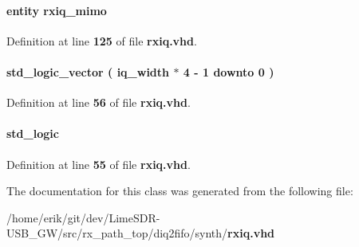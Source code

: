 \paragraph[{inst1\+\_\+rxiq\+\_\+mimo}]{ {\bfseries \textcolor{keywordflow}{entity}\textcolor{vhdlchar}{ }\textcolor{vhdlchar}{rxiq\+\_\+mimo}\textcolor{vhdlchar}{ }} \hspace{0.3cm}{\ttfamily [Instantiation]}}\label{classrxiq_1_1arch_a820adc5ca8b4e0109aa7436087538522}


Definition at line {\bf 125} of file {\bf rxiq.\+vhd}.

\paragraph[{mux\+\_\+fifo\+\_\+wdata}]{ {\bfseries \textcolor{comment}{std\+\_\+logic\+\_\+vector}\textcolor{vhdlchar}{ }\textcolor{vhdlchar}{(}\textcolor{vhdlchar}{ }\textcolor{vhdlchar}{ }\textcolor{vhdlchar}{ }\textcolor{vhdlchar}{ }{\bfseries {\bf iq\+\_\+width}} \textcolor{vhdlchar}{$\ast$}\textcolor{vhdlchar}{ } \textcolor{vhdldigit}{4} \textcolor{vhdlchar}{-\/}\textcolor{vhdlchar}{ } \textcolor{vhdldigit}{1} \textcolor{vhdlchar}{ }\textcolor{keywordflow}{downto}\textcolor{vhdlchar}{ }\textcolor{vhdlchar}{ } \textcolor{vhdldigit}{0} \textcolor{vhdlchar}{ }\textcolor{vhdlchar}{)}\textcolor{vhdlchar}{ }} \hspace{0.3cm}{\ttfamily [Signal]}}\label{classrxiq_1_1arch_aa03056f73be7924fbbf5b9ace3e06f3b}


Definition at line {\bf 56} of file {\bf rxiq.\+vhd}.

\paragraph[{mux\+\_\+fifo\+\_\+wrreq}]{ {\bfseries \textcolor{comment}{std\+\_\+logic}\textcolor{vhdlchar}{ }} \hspace{0.3cm}{\ttfamily [Signal]}}\label{classrxiq_1_1arch_ab4526061768b458604c6d3d36c712824}


Definition at line {\bf 55} of file {\bf rxiq.\+vhd}.



The documentation for this class was generated from the following file\+:\begin{DoxyCompactItemize}
\item 
/home/erik/git/dev/\+Lime\+S\+D\+R-\/\+U\+S\+B\+\_\+\+G\+W/src/rx\+\_\+path\+\_\+top/diq2fifo/synth/{\bf rxiq.\+vhd}\end{DoxyCompactItemize}
